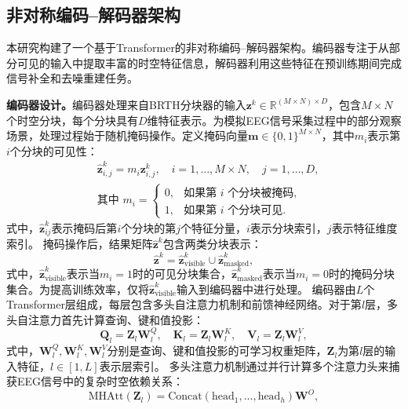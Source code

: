 \subsection{非对称编码--解码器架构}
本研究构建了一个基于Transformer的非对称编码--解码器架构\cite{he2022masked}。编码器专注于从部分可见的输入中提取丰富的时空特征信息，解码器利用这些特征在预训练期间完成信号补全和去噪重建任务。

\textbf{编码器设计。}编码器处理来自BRTH分块器的输入$\mathbf{z}^k \in \mathbb{R}^{(M\times N)\times D}$，包含$M\times N$个时空分块，每个分块具有$D$维特征表示。为模拟EEG信号采集过程中的部分观察场景，处理过程始于随机掩码操作。定义掩码向量$\mathbf{m} \in \{0,1\}^{M\times N}$，其中$m_i$表示第$i$个分块的可见性：
\begin{equation}
\begin{aligned}
&\mathbf{\hat{z}}^k_{i,j} = {m_i} \mathbf{z}^k_{i,j}, \quad  i=1,\ldots,{M\times N}, \quad j=1,\ldots,D,\\
&\text{其中 } m_i =
    \begin{cases}
    0, & \text{如果第 } i \text{ 个分块被掩码},\\
    1, & \text{如果第 } i \text{ 个分块可见}.
    \end{cases}
\end{aligned}
\end{equation}
式中，$\mathbf{\hat{z}}^k_{ij}$表示掩码后第$i$个分块的第$j$个特征分量，$i$表示分块索引，$j$表示特征维度索引。
掩码操作后，结果矩阵$\mathbf{\hat{z}}^k$包含两类分块表示：
\begin{equation}
\mathbf{\hat{z}}^k = \mathbf{\hat{z}}^k_{\text{visible}} \cup \mathbf{\hat{z}}^k_{\text{masked}},
\end{equation}
式中，$\mathbf{\hat{z}}^k_{\text{visible}}$表示当$m_i = 1$时的可见分块集合，$\mathbf{\hat{z}}^k_{\text{masked}}$表示当$m_i = 0$时的掩码分块集合。为提高训练效率，仅将$\mathbf{\hat{z}}^k_{\text{visible}}$输入到编码器中进行处理。
编码器由$L$个Transformer层组成，每层包含多头自注意力机制和前馈神经网络。对于第$l$层，多头自注意力首先计算查询、键和值投影：
\begin{equation}
\mathbf{Q}_l = \mathbf{Z}_l\mathbf{W}_l^Q, \quad
\mathbf{K}_l = \mathbf{Z}_l\mathbf{W}_l^K, \quad
\mathbf{V}_l = \mathbf{Z}_l\mathbf{W}_l^V,
\end{equation}
式中，$\mathbf{W}_l^Q, \mathbf{W}_l^K, \mathbf{W}_l^V$分别是查询、键和值投影的可学习权重矩阵，$\mathbf{Z}_l$为第$l$层的输入特征，$l \in [1, L]$表示层索引。
多头注意力机制通过并行计算多个注意力头来捕获EEG信号中的复杂时空依赖关系：
\begin{equation}
\text{MHAtt}(\mathbf{Z}_l) = \text{Concat}(\text{head}_1, ..., \text{head}_h)\mathbf{W}^O,
\end{equation}
